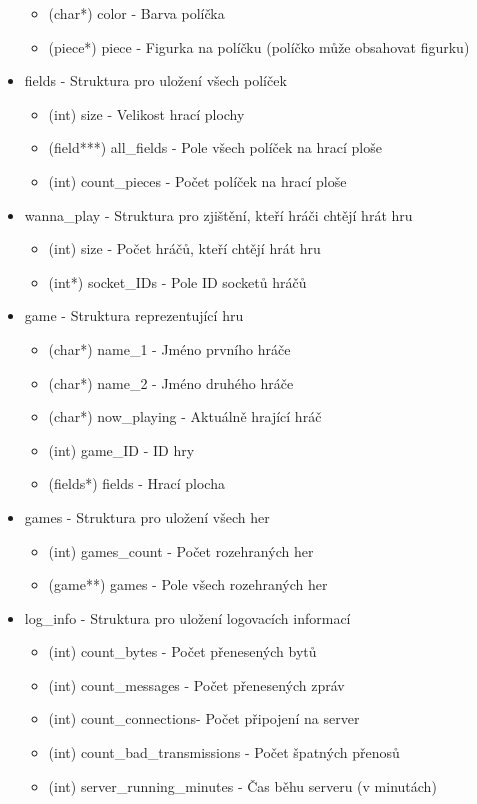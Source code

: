 \documentclass[12pt, a4paper]{article}
\begin{document}
\begin{itemize}
\begin{itemize}
	\item (char*) color - Barva políčka
	\item (piece*) piece - Figurka na políčku (políčko může obsahovat figurku)
	\end{itemize}	 
\item fields - Struktura pro uložení všech políček
	\begin{itemize}
	\item (int) size - Velikost hrací plochy
	\item (field***) all\_fields - Pole všech políček na hrací ploše
	\item (int) count\_pieces - Počet políček na hrací ploše 
	\end{itemize}	 
\item wanna\_play - Struktura pro zjištění, kteří hráči chtějí hrát hru
	\begin{itemize}
	\item (int) size - Počet hráčů, kteří chtějí hrát hru
	\item (int*) socket\_IDs - Pole ID socketů hráčů
	\end{itemize}	 
\item game - Struktura reprezentující hru
	\begin{itemize}
	\item (char*) name\_1 - Jméno prvního hráče
	\item (char*) name\_2 - Jméno druhého hráče
	\item (char*) now\_playing - Aktuálně hrající hráč
	\item (int) game\_ID - ID hry
	\item (fields*) fields - Hrací plocha
	\end{itemize}	 
\item games - Struktura pro uložení všech her
	\begin{itemize}
	\item (int) games\_count - Počet rozehraných her
	\item (game**) games - Pole všech rozehraných her
	\end{itemize}	 
\item log\_info - Struktura pro uložení logovacích informací
	\begin{itemize}
	\item (int) count\_bytes - Počet přenesených bytů
	\item (int) count\_messages - Počet přenesených zpráv
	\item (int) count\_connections- Počet připojení na server
	\item (int) count\_bad\_transmissions - Počet špatných přenosů
	\item (int) server\_running\_minutes - Čas běhu serveru (v minutách)
	\end{itemize}	 
\end{itemize}
\end{document}
